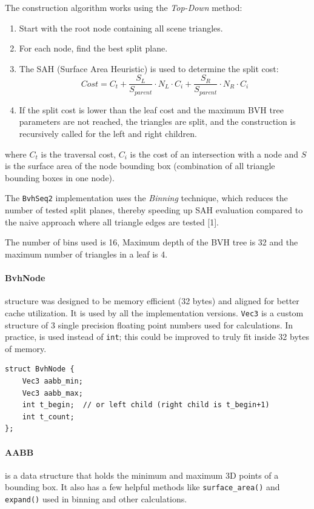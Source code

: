 \documentclass[10pt,a4paper,twocolumn]{article}
\begin{document}
The construction algorithm works using the \textit{Top-Down} method:
\begin{enumerate}
    \item Start with the root node containing all scene triangles.
    \item For each node, find the best split plane.
    \item The SAH (Surface Area Heuristic) is used to determine the split cost:
    \begin{equation}
        Cost = C_t + \frac{S_L}{S_{parent}} \cdot N_L \cdot C_i + \frac{S_R}{S_{parent}} \cdot N_R \cdot C_i
    \end{equation}
    \item If the split cost is lower than the leaf cost and the maximum BVH tree parameters are not reached, the triangles are split, and the construction is recursively called for the left and right children.
\end{enumerate}
where $C_t$ is the traversal cost, $C_i$ is the cost of an intersection with a node and $S$ is the surface area of the node bounding box (combination of all triangle bounding boxes in one node).

The \texttt{BvhSeq2} implementation uses the \textit{Binning} technique, which reduces the number of tested split planes, thereby speeding up SAH evaluation compared to the naive approach where all triangle edges are tested [1].

The number of bins used is 16, Maximum depth of the BVH tree is 32 and the maximum number of triangles in a leaf is 4.

\paragraph{BvhNode} structure was designed to be memory efficient (32 bytes) and aligned for better cache utilization. It is used by all the implementation versions. \texttt{Vec3} is a custom structure of 3 single precision floating point numbers used for calculations. In practice, \texttt{} is used instead of \texttt{int}; this could be improved to truly fit inside 32 bytes of memory.

\begin{lstlisting}
struct BvhNode {
    Vec3 aabb_min;
    Vec3 aabb_max;
    int t_begin;  // or left child (right child is t_begin+1)
    int t_count;
};
\end{lstlisting}

\paragraph{AABB} is a data structure that holds the minimum and maximum 3D points of a bounding box. It also has a few helpful methods like \texttt{surface\_area()} and \texttt{expand()} used in binning and other calculations.
\end{document}
